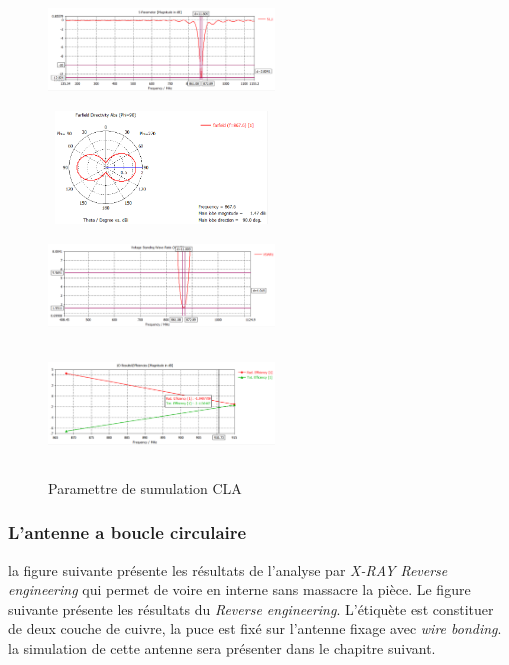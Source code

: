\documentclass[11pt, a4paper, twoside]{book}
\begin{document}
\begin{figure}[h]
\centering
\includegraphics[width=6cm,height=3cm]{claaaass11}
\includegraphics[width=6cm,height=3cm]{claPattern}
\includegraphics[width=6cm,height=3cm]{claaavswr}
\includegraphics[width=6cm,height=3cm]{claefficency}
\caption{Paramettre de sumulation CLA}
\end{figure} 


\subsubsection{L'antenne a boucle circulaire}
la figure suivante présente les résultats de l'analyse par  \emph{X-RAY Reverse engineering} qui permet de voire en interne sans massacre la pièce. Le figure suivante présente les résultats du \emph{Reverse engineering}. L'étiquète est constituer de deux couche de cuivre, la puce est fixé sur l'antenne fixage avec \emph{wire bonding}. la simulation de cette antenne sera présenter dans le chapitre suivant. \\
\end{document}
